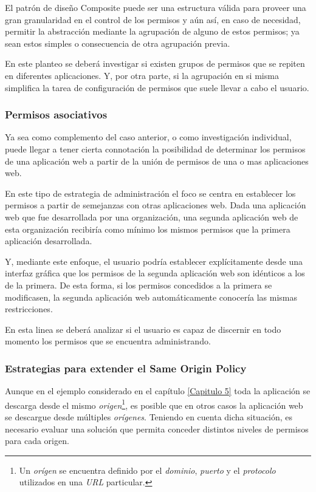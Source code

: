 El patrón de diseño Composite puede ser una estructura válida para proveer una gran granularidad en el control de los permisos y aún así, en caso de necesidad, permitir la abstracción mediante la agrupación de alguno de estos permisos; ya sean estos simples o consecuencia de otra agrupación previa.

En este planteo se deberá investigar si existen grupos de permisos que se repiten en diferentes aplicaciones. Y, por otra parte, si la agrupación en si misma simplifica la tarea de configuración de permisos que suele llevar a cabo el usuario.


\subsubsection{Permisos asociativos}

Ya sea como complemento del caso anterior, o como investigación individual, puede llegar a tener cierta connotación la posibilidad de determinar los permisos de una aplicación web a partir de la unión de permisos de una o mas aplicaciones web.

En este tipo de estrategia de administración el foco se centra en establecer los permisos a partir de semejanzas con otras aplicaciones web. Dada una aplicación web que fue desarrollada por una organización, una segunda aplicación web de esta organización recibiría como mínimo los mismos permisos que la primera aplicación desarrollada.

Y, mediante este enfoque, el usuario podría establecer explícitamente desde una interfaz gráfica que los permisos de la segunda aplicación web son idénticos a los de la primera. De esta forma, si los permisos concedidos a la primera se modificasen, la segunda aplicación web automáticamente conocería las mismas restricciones.

En esta linea se deberá analizar si el usuario es capaz de discernir en todo momento los permisos que se encuentra administrando.


\subsubsection{Estrategias para extender el Same Origin Policy}

Aunque en el ejemplo considerado en el capítulo \ref{Capitulo 5} toda la aplicación se descarga desde el mismo \emph{origen}\footnote{Un \emph{orígen} se encuentra definido por el \emph{dominio}, \emph{puerto} y el \emph{protocolo} utilizados en una \emph{URL} particular.}, es posible que en otros casos la aplicación web se descargue desde múltiples \emph{orígenes}. Teniendo en cuenta dicha situación, es necesario evaluar una solución que permita conceder distintos niveles de permisos para cada origen.

